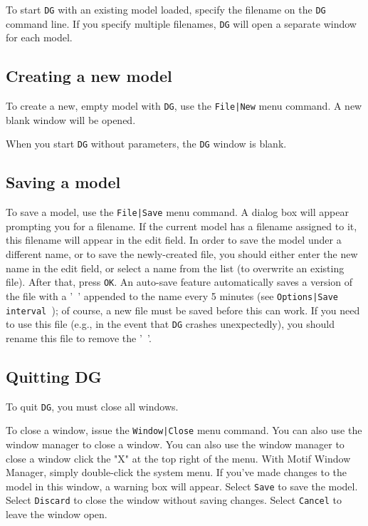 \documentclass[a4paper,10pt]{report}
\begin{document}
To start {\tt DG} with an existing model loaded, specify the filename on the
{\tt DG} command line. If you specify multiple filenames, {\tt DG} will open a
separate window for each model.

\subsection{Creating a new model}

To create a new, empty model with {\tt DG}, use the {\tt File|New} menu
command. A new blank window will be opened.

When you start {\tt DG} without parameters, the {\tt DG} window is blank.

\subsection{Saving a model}

To save a model, use the {\tt File|Save} menu command. A dialog
box will appear prompting you for a filename. If the current model has
a filename assigned to it, this filename will appear in the edit
field.  In order to save the model under a different name, or to save
the newly-created file, you should either enter the new name in the
edit field, or select a name from the list (to overwrite an existing
file).  After that, press {\tt OK}. An auto-save feature
automatically saves a version of the file with a '{\tt ~}'
appended to the name every 5 minutes (see
{\tt Options|Save interval }); of course, a new file must
be saved before this can work.  If you need to use this file (e.g.,
in the event that {\tt DG} crashes unexpectedly), you should rename this
file to remove the '{\tt ~}'.

\subsection{Quitting DG}

To quit {\tt DG}, you must close all windows.

To close a window, issue the {\tt Window|Close} menu command. You can
also use the window manager to close a window.
You can also use the window manager to close a window
click the "X" at the top right of the menu. With Motif Window
Manager, simply double-click the system menu. If you've made changes
to the model in this window, a warning box will appear. Select
{\tt Save} to save the model. Select {\tt Discard} to close the
window without saving changes. Select {\tt Cancel} to leave the
window open.
\end{document}
